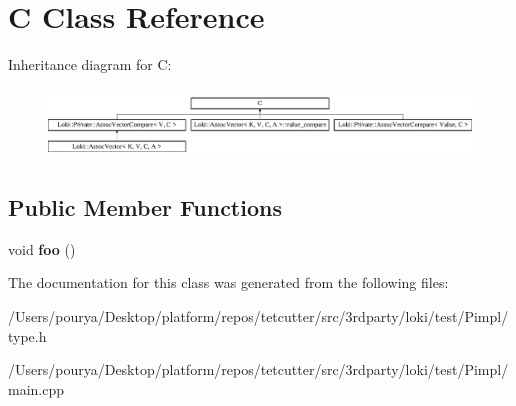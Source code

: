 \hypertarget{classC}{}\section{C Class Reference}
\label{classC}
Inheritance diagram for C\+:\begin{figure}[H]
\begin{center}
\leavevmode
\includegraphics[height=1.860465cm]{classC}
\end{center}
\end{figure}
\subsection*{Public Member Functions}
\begin{DoxyCompactItemize}
\item 
\hypertarget{classC_a1d3e99de8d97baa0a390889791f39ec4}{}void {\bfseries foo} ()\label{classC_a1d3e99de8d97baa0a390889791f39ec4}

\end{DoxyCompactItemize}


The documentation for this class was generated from the following files\+:\begin{DoxyCompactItemize}
\item 
/\+Users/pourya/\+Desktop/platform/repos/tetcutter/src/3rdparty/loki/test/\+Pimpl/type.\+h\item 
/\+Users/pourya/\+Desktop/platform/repos/tetcutter/src/3rdparty/loki/test/\+Pimpl/main.\+cpp\end{DoxyCompactItemize}
